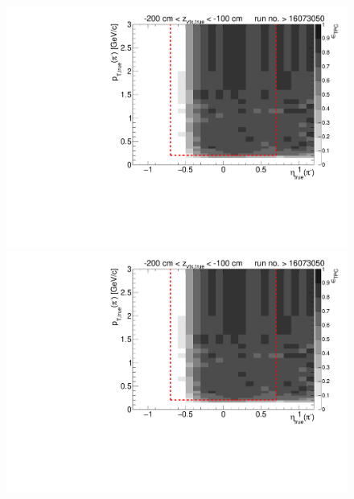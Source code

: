 \begin{figure}[hb]
{		\includegraphics[width=\linewidth,page=16]{graphics/eff/Eff2D_TPC_pion_Minus_RunRange2.pdf}\\
		\includegraphics[width=\linewidth,page=18]{graphics/eff/Eff2D_TPC_pion_Minus_RunRange2.pdf}
	}%
\end{figure}

